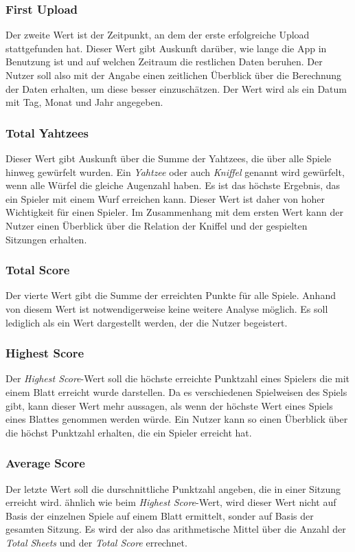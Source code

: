 \subsubsection{First Upload}
Der zweite Wert ist der Zeitpunkt, an dem der erste erfolgreiche Upload stattgefunden hat. Dieser Wert gibt Auskunft darüber, wie lange die App in Benutzung ist und auf welchen Zeitraum die restlichen Daten beruhen. Der Nutzer soll also mit der Angabe einen zeitlichen Überblick über die Berechnung der Daten erhalten, um diese besser einzuschätzen. Der Wert wird als ein Datum mit Tag, Monat und Jahr angegeben.

\subsubsection{Total Yahtzees}
Dieser Wert gibt Auskunft über die Summe der Yahtzees, die über alle Spiele hinweg gewürfelt wurden. Ein \textit{Yahtzee} oder auch \textit{Kniffel} genannt wird gewürfelt, wenn alle Würfel die gleiche Augenzahl haben. Es ist das höchste Ergebnis, das ein Spieler mit einem Wurf erreichen kann. Dieser Wert ist daher von hoher Wichtigkeit für einen Spieler. Im Zusammenhang mit dem ersten Wert kann der Nutzer einen Überblick über die Relation der Kniffel und der gespielten Sitzungen erhalten.

\subsubsection{Total Score}
Der vierte Wert gibt die Summe der erreichten Punkte für alle Spiele. Anhand von diesem Wert ist notwendigerweise keine weitere Analyse möglich. Es soll lediglich als ein Wert dargestellt werden, der die Nutzer begeistert.

\subsubsection{Highest Score}
Der \textit{Highest Score}-Wert soll die höchste erreichte Punktzahl eines Spielers die mit einem Blatt erreicht wurde darstellen. Da es verschiedenen Spielweisen des Spiels gibt, kann dieser Wert mehr aussagen, als wenn der höchste Wert eines Spiels eines Blattes genommen werden würde. Ein Nutzer kann so einen Überblick über die höchst Punktzahl erhalten, die ein Spieler erreicht hat.

\subsubsection{Average Score}
Der letzte Wert soll die durschnittliche Punktzahl angeben, die in einer Sitzung erreicht wird. ähnlich wie beim \textit{Highest Score}-Wert, wird dieser Wert nicht auf Basis der einzelnen Spiele auf einem Blatt ermittelt, sonder auf Basis der gesamten Sitzung. Es wird der also das arithmetische Mittel über die Anzahl der \textit{Total Sheets} und der \textit{Total Score} errechnet.

